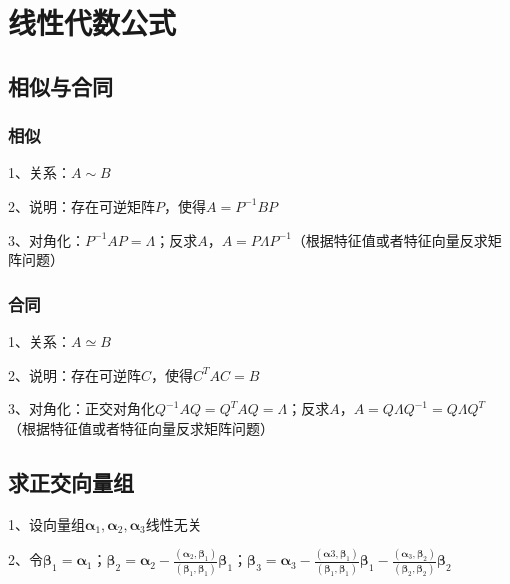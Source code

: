 \chapter{线性代数公式}

\section{相似与合同}



\subsection{相似}

1、关系：$A \sim B$

2、说明：存在可逆矩阵$P$，使得$A=P^{-1}BP$

3、对角化：$P^{-1}AP=\Lambda$；反求$A$，$A=P\Lambda P^{-1}$（根据特征值或者特征向量反求矩阵问题）



\subsection{合同}

1、关系：$A \simeq B$

2、说明：存在可逆阵$C$，使得$C^TAC=B$

3、对角化：正交对角化$Q^{-1}AQ=Q^TAQ=\Lambda$；反求$A$，$A=Q\Lambda Q^{-1}=Q\Lambda Q^{T}$（根据特征值或者特征向量反求矩阵问题）

\section{求正交向量组}

1、设向量组$\boldsymbol{\alpha}_{1}, \boldsymbol{\alpha}_{2}, \boldsymbol{\alpha}_{3}$线性无关

2、令$\boldsymbol{\beta}_{1}=\boldsymbol{\alpha}_{1}$；$\boldsymbol{\beta}_{2}=\boldsymbol{\alpha}_{2}-\frac{\left(\boldsymbol{\alpha}_{2}, \boldsymbol{\beta}_{1}\right)}{\left(\boldsymbol{\beta}_{1}, \boldsymbol{\beta}_{1}\right)} \boldsymbol{\beta}_{1}$；$\boldsymbol{\beta}_{3}=\boldsymbol{\alpha}_{3}-\frac{\left(\boldsymbol{\alpha}{3}, \boldsymbol{\beta}_{1}\right)}{\left(\boldsymbol{\beta}_{1}, \boldsymbol{\beta}_{1}\right)} \boldsymbol{\beta}_{1}-\frac{\left(\boldsymbol{\alpha}_{3}, \boldsymbol{\beta}_{2}\right)}{\left(\boldsymbol{\beta}_{2}, \boldsymbol{\beta}_{2}\right)} \boldsymbol{\beta}_{2}$

